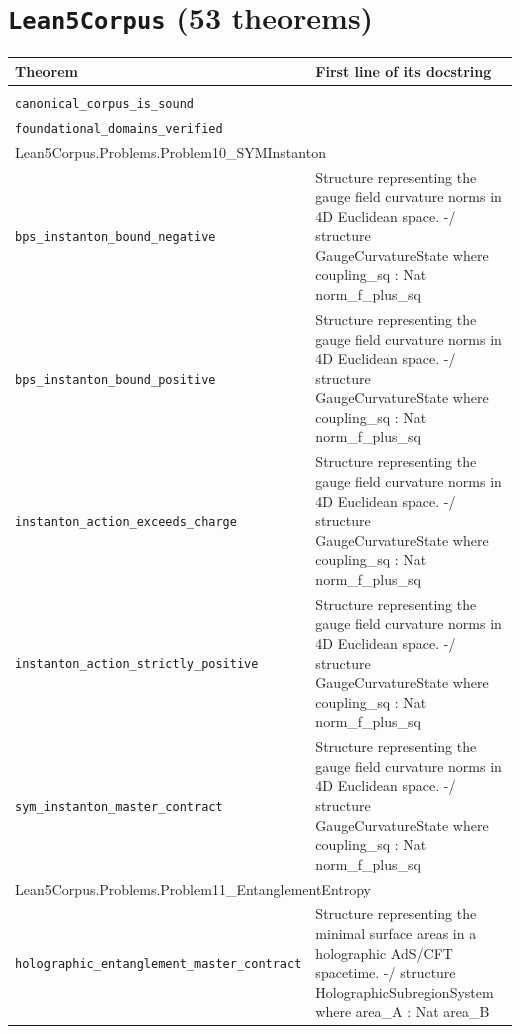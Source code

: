 \section*{\texttt{Lean5Corpus} (53 theorems)}
\begin{longtable}{p{}p{}}\toprule Theorem & First line of its docstring \\ \midrule\endhead\bottomrule\endfoot
\multicolumn{2}{l}{\textsf{\small Lean5Corpus.Foundations.Narrative}} \\
\quad\texttt{\footnotesize canonical\_corpus\_is\_sound} & {\footnotesize } \\
\quad\texttt{\footnotesize foundational\_domains\_verified} & {\footnotesize } \\
\multicolumn{2}{l}{\textsf{\small Lean5Corpus.Problems.Problem10\_SYMInstanton}} \\
\quad\texttt{\footnotesize bps\_instanton\_bound\_negative} & {\footnotesize Structure representing the gauge field curvature norms in 4D Euclidean space. -/ structure GaugeCurvatureState where coupling\_sq : Nat norm\_f\_plus\_sq } \\
\quad\texttt{\footnotesize bps\_instanton\_bound\_positive} & {\footnotesize Structure representing the gauge field curvature norms in 4D Euclidean space. -/ structure GaugeCurvatureState where coupling\_sq : Nat norm\_f\_plus\_sq } \\
\quad\texttt{\footnotesize instanton\_action\_exceeds\_charge} & {\footnotesize Structure representing the gauge field curvature norms in 4D Euclidean space. -/ structure GaugeCurvatureState where coupling\_sq : Nat norm\_f\_plus\_sq } \\
\quad\texttt{\footnotesize instanton\_action\_strictly\_positive} & {\footnotesize Structure representing the gauge field curvature norms in 4D Euclidean space. -/ structure GaugeCurvatureState where coupling\_sq : Nat norm\_f\_plus\_sq } \\
\quad\texttt{\footnotesize sym\_instanton\_master\_contract} & {\footnotesize Structure representing the gauge field curvature norms in 4D Euclidean space. -/ structure GaugeCurvatureState where coupling\_sq : Nat norm\_f\_plus\_sq } \\
\multicolumn{2}{l}{\textsf{\small Lean5Corpus.Problems.Problem11\_EntanglementEntropy}} \\
\quad\texttt{\footnotesize holographic\_entanglement\_master\_contract} & {\footnotesize Structure representing the minimal surface areas in a holographic AdS/CFT spacetime. -/ structure HolographicSubregionSystem where area\_A : Nat area\_B} \\

\end{longtable}
